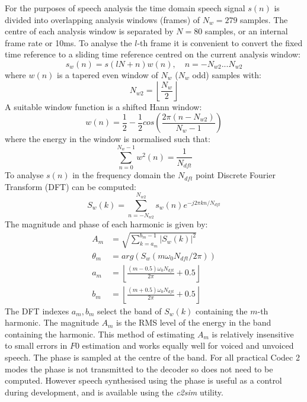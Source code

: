 \documentclass{article}
\begin{document}
For the purposes of speech analysis the time domain speech signal $s(n)$ is divided into overlapping analysis windows (frames) of $N_w=279$ samples. The centre of each analysis window is separated by $N=80$ samples, or an internal frame rate or 10ms. To analyse the $l$-th frame it is convenient to convert the fixed time reference to a sliding time reference centred on the current analysis window:
\begin{equation}
s_w(n) = s(lN + n) w(n), \quad n = - N_{w2} ... N_{w2}
\end{equation}
where $w(n)$ is a tapered even window of $N_w$ ($N_w$ odd) samples with:
\begin{equation}
N_{w2} = \left \lfloor \frac{N_w}{2} \right \rfloor
\end{equation}
A suitable window function is a shifted Hann window:
\begin{equation}
w(n) = \frac{1}{2} - \frac{1}{2} cos \left(\frac{2 \pi (n- N_{w2})}{N_w-1} \right)
\end{equation}
where the energy in the window is normalised such that:
\begin{equation}
\sum_{n=0}^{N_w-1}w^2(n) = \frac{1}{N_{dft}}
\end{equation}
To analyse $s(n)$ in the frequency domain the $N_{dft}$ point Discrete Fourier Transform (DFT) can be computed:
\begin{equation}
S_w(k) = \sum_{n=-N_{w2}}^{N_{w2}} s_w(n) e^{-j 2 \pi k n / N_{dft}}
\end{equation}
The magnitude and phase of each harmonic is given by:
\begin{equation}
\begin{split}
A_m      &= \sqrt{\sum_{k=a_m}^{b_m-1} |S_w(k)|^2 } \\
\theta_m &= arg \left( S_w(m \omega_0 N_{dft} / 2 \pi) \right) \\
a_m      &= \left \lfloor \frac{(m - 0.5)\omega_0 N_{dft}}{2 \pi} + 0.5 \right \rfloor \\
b_m      &= \left \lfloor \frac{(m + 0.5)\omega_0 N_{dft}}{2 \pi} + 0.5 \right \rfloor
\end{split}
\end{equation}
The DFT indexes $a_m, b_m$ select the band of $S_w(k)$ containing the $m$-th harmonic. The magnitude $A_m$ is the RMS level of the energy in the band containing the harmonic.  This method of estimating $A_m$ is relatively insensitive to small errors in $F0$ estimation and works equally well for voiced and unvoiced speech. The phase is sampled at the centre of the band.  For all practical Codec 2 modes the phase is not transmitted to the decoder so does not need to be computed.  However speech synthesised using the phase is useful as a control during development, and is available using the \emph{c2sim} utility.
\end{document}
